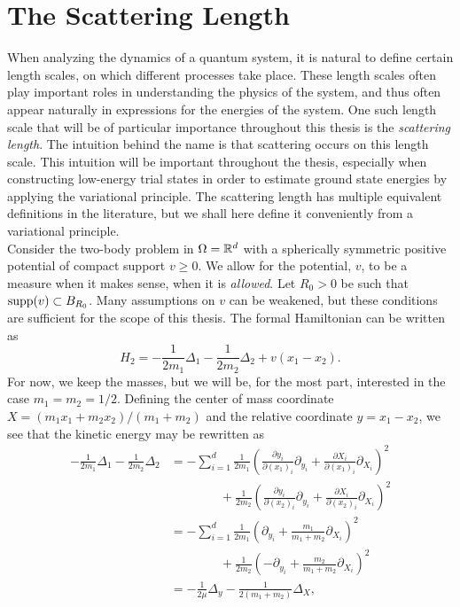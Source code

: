 \section{The Scattering Length}
When analyzing the dynamics of a quantum system, it is natural to define certain length scales, on which different processes take place. These length scales often play important roles in understanding the physics of the system, and thus often appear naturally in expressions for the energies of the system. One such length scale that will be of particular importance throughout this thesis is the \emph{scattering length}. The intuition behind the name is that scattering occurs on this length scale. This intuition will be important throughout the thesis, especially when constructing low-energy trial states in order to estimate ground state energies by applying the variational principle. The scattering length has multiple equivalent definitions in the literature, but we shall here define it conveniently from a variational principle.\\
Consider the two-body problem in $ \Omega=\mathbb{R}^d $ with a spherically symmetric positive potential of compact support $ v\geq 0 $. We allow for the potential, $ v $, to be a measure when it makes sense, \ie when it is \emph{allowed}. Let $ R_0>0 $ be such that $ \text{supp}(v)\subset B_{R_0} $. Many assumptions on $ v $ can be weakened, but these conditions are sufficient for the scope of this thesis. The formal Hamiltonian can be written as \begin{equation}
H_2=-\frac{1}{2m_1}\Delta_1-\frac{1}{2m_2}\Delta_2+v(x_1-x_2).
\end{equation}
For now, we keep the masses, but we will be, for the most part, interested in the case $ m_1=m_2=1/2 $. Defining the center of mass coordinate $ X=(m_1x_1+m_2x_2)/(m_1+m_2) $ and the relative coordinate $ y=x_1-x_2 $, we see that the kinetic energy may be rewritten as \begin{equation}
\begin{aligned}
-\frac{1}{2m_1}\Delta_1-\frac{1}{2m_2}\Delta_2&=-\sum_{i=1}^{d}\frac{1}{2m_1}\left(\frac{\partial y_i}{\partial (x_1)_i}\partial_{y_i}+\frac{\partial X_i}{\partial (x_1)_i}\partial_{X_i}\right)^2\\&\qquad\qquad+\frac{1}{2m_2}\left(\frac{\partial y_i}{\partial (x_2)_i}\partial_{y_i}+\frac{\partial X_i}{\partial (x_2)_i}\partial_{X_i}\right)^2\\
&=-\sum_{i=1}^{d}\frac{1}{2m_1}\left(\partial_{y_i}+\frac{m_1}{m_1+m_2}\partial_{X_i}\right)^2\\&\qquad\qquad+\frac{1}{2m_2}\left(-\partial_{y_i}+\frac{m_2}{m_1+m_2}\partial_{X_i}\right)^2\\
&=-\frac{1}{2\mu}\Delta_y-\frac{1}{2(m_1+m_2)}\Delta_X,
\end{aligned}
\end{equation}
